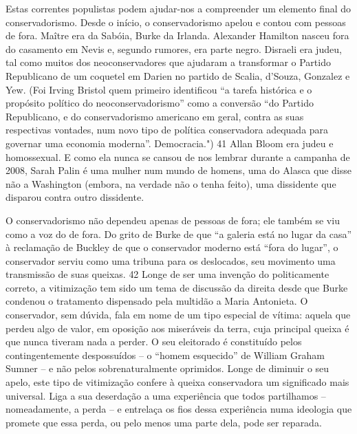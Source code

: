Estas correntes populistas podem ajudar-nos a compreender um elemento final do conservadorismo. Desde o início, o conservadorismo apelou e contou com pessoas de fora. Maître era da Sabóia, Burke da Irlanda. Alexander Hamilton nasceu fora do casamento em Nevis e, segundo rumores, era parte negro. Disraeli era judeu, tal como muitos dos neoconservadores que ajudaram a transformar o Partido Republicano de um coquetel em Darien no partido de Scalia, d’Souza, Gonzalez e Yew. (Foi Irving Bristol quem primeiro identificou “a tarefa histórica e o propósito político do neoconservadorismo” como a conversão “do Partido Republicano, e do conservadorismo americano em geral, contra as suas respectivas vontades, num novo tipo de política conservadora adequada para governar uma economia moderna”. Democracia.")
 {\color{blue} 41}  
Allan Bloom era judeu e homossexual. E como ela nunca se cansou de nos lembrar durante a campanha de 2008, Sarah Palin é uma mulher num mundo de homens, uma do Alasca que disse não a Washington (embora, na verdade não o tenha feito), uma dissidente que disparou contra outro dissidente.
 
\par
 
O conservadorismo não dependeu apenas de pessoas de fora; ele também se viu como a voz do de fora. Do grito de Burke de que “a galeria está no lugar da casa” à reclamação de Buckley de que o conservador moderno está “fora do lugar”, o conservador serviu como uma tribuna para os deslocados, seu movimento uma transmissão de suas queixas.
 {\color{blue} 42}  
Longe de ser uma invenção do politicamente correto, a vitimização tem sido um tema de discussão da direita desde que Burke condenou o tratamento dispensado pela multidão a Maria Antonieta. O conservador, sem dúvida, fala em nome de um tipo especial de vítima: aquela que perdeu algo de valor, em oposição aos miseráveis ​​da terra, cuja principal queixa é que nunca tiveram nada a perder. O seu eleitorado é constituído pelos contingentemente despossuídos – o “homem esquecido” de William Graham Sumner – e não pelos sobrenaturalmente oprimidos. Longe de diminuir o seu apelo, este tipo de vitimização confere à queixa conservadora um significado mais universal. Liga a sua deserdação a uma experiência que todos partilhamos – nomeadamente, a perda – e entrelaça os fios dessa experiência numa ideologia que promete que essa perda, ou pelo menos uma parte dela, pode ser reparada.
 
\par
 
